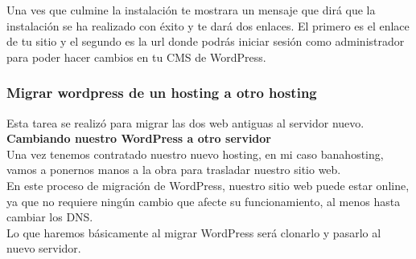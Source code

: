 		Una ves que culmine la instalación te mostrara un mensaje que dirá que la instalación se ha realizado con éxito y te dará dos enlaces. El primero es el enlace de tu sitio y el segundo es la url donde podrás iniciar sesión como administrador para poder hacer cambios en tu CMS de WordPress.\\
		
		\newpage
		
		\subsubsection{Migrar wordpress de un hosting a otro hosting}
		
		Esta tarea se realizó para migrar las dos web antiguas al servidor nuevo.\\

		\textbf{Cambiando nuestro WordPress a otro servidor}\\
		
		Una vez tenemos contratado nuestro nuevo hosting, en mi caso banahosting, vamos a ponernos manos a la obra para trasladar nuestro sitio web.\\
		
		En este proceso de migración de WordPress, nuestro sitio web puede estar online, ya que no requiere ningún cambio que afecte su funcionamiento, al menos hasta cambiar los DNS.\\
		
		Lo que haremos básicamente al migrar WordPress será clonarlo y pasarlo al nuevo servidor.
		
